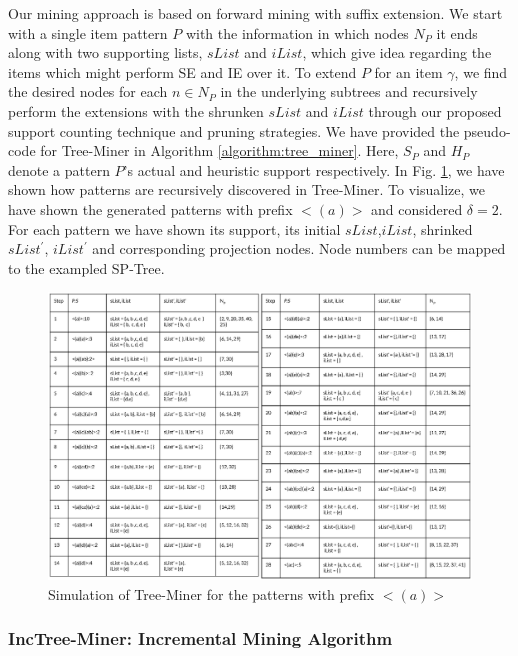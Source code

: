 Our mining approach is based on forward mining with suffix extension. We start with a single item pattern $P$ with the information in which nodes $N_{P}$ it ends along with two supporting lists, $sList$ and $iList$, which give idea regarding the items which might perform SE and IE over it. To extend $P$ for an item $\gamma$, we find the desired nodes for each $n \in N_{P}$ in the underlying subtrees and recursively perform the extensions with the shrunken $sList$ and $iList$ through our proposed support counting technique and pruning strategies. We have provided the pseudo-code for Tree-Miner in Algorithm \ref{algorithm:tree_miner}. Here, $S_{P}$ and $H_{P}$ denote a pattern $P$'s actual and heuristic support respectively. In Fig. \ref{figure:tree_miner_simulation}, we have shown how patterns are recursively discovered in Tree-Miner. To visualize, we have shown the generated patterns with prefix $< (a) >$ and considered $\delta=2$. For each pattern we have shown its support, its initial $sList$,$iList$, shrinked $sList^{\prime}$, $iList^{\prime}$ and corresponding projection nodes. Node numbers can be mapped to the exampled SP-Tree.



\begin{figure}[!tb]
\centering
\includegraphics[width=\textwidth]{Tree-Miner-Simulation}
\caption{Simulation of Tree-Miner for the patterns with prefix $< (a) >$} \label{figure:tree_miner_simulation}
\hfil
\end{figure}

\subsubsection{IncTree-Miner: Incremental Mining Algorithm}


